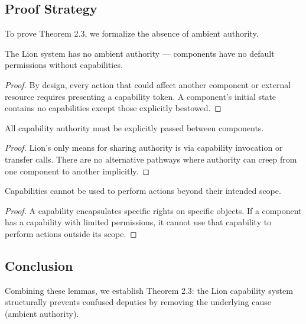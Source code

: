 \subsection{Proof Strategy}

To prove Theorem 2.3, we formalize the absence of ambient authority.

\begin{lemma}
The Lion system has no ambient authority — components have no default permissions without capabilities.
\end{lemma}

\begin{proof}
By design, every action that could affect another component or external resource requires presenting a capability token. A component's initial state contains no capabilities except those explicitly bestowed.
\end{proof}

\begin{lemma}
All capability authority must be explicitly passed between components.
\end{lemma}

\begin{proof}
Lion's only means for sharing authority is via capability invocation or transfer calls. There are no alternative pathways where authority can creep from one component to another implicitly.
\end{proof}

\begin{lemma}
Capabilities cannot be used to perform actions beyond their intended scope.
\end{lemma}

\begin{proof}
A capability encapsulates specific rights on specific objects. If a component has a capability with limited permissions, it cannot use that capability to perform actions outside its scope.
\end{proof}

\subsection{Conclusion}

Combining these lemmas, we establish Theorem 2.3: the Lion capability system structurally prevents confused deputies by removing the underlying cause (ambient authority).

\newpage

